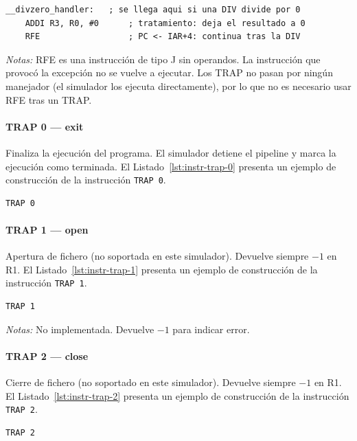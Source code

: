 \documentclass[../main.tex]{subfiles}
\begin{document}
\begin{lstlisting}[caption={RFE},label={lst:instr-rfe}]
	__divzero_handler:   ; se llega aqui si una DIV divide por 0
	ADDI R3, R0, #0      ; tratamiento: deja el resultado a 0
	RFE                  ; PC <- IAR+4: continua tras la DIV
\end{lstlisting}
\textit{Notas:} RFE es una instrucción de tipo J sin operandos. La instrucción que provocó la excepción no se vuelve a ejecutar. Los TRAP no pasan por ningún manejador (el simulador los ejecuta directamente), por lo que no es necesario usar RFE tras un TRAP.

\paragraph*{TRAP 0 --- exit}
Finaliza la ejecución del programa. El simulador detiene el pipeline y marca la ejecución como terminada.
El Listado~\ref{lst:instr-trap-0} presenta un ejemplo de construcción de la instrucción \texttt{TRAP 0}.

\begin{lstlisting}[caption={TRAP 0},label={lst:instr-trap-0}]
	TRAP 0
\end{lstlisting}

\paragraph*{TRAP 1 --- open}
Apertura de fichero (no soportada en este simulador). Devuelve siempre $-1$ en R1.
El Listado~\ref{lst:instr-trap-1} presenta un ejemplo de construcción de la instrucción \texttt{TRAP 1}.

\begin{lstlisting}[caption={TRAP 1},label={lst:instr-trap-1}]
	TRAP 1
\end{lstlisting}
\textit{Notas:} No implementada. Devuelve $-1$ para indicar error.

\paragraph*{TRAP 2 --- close}
Cierre de fichero (no soportado en este simulador). Devuelve siempre $-1$ en R1.
El Listado~\ref{lst:instr-trap-2} presenta un ejemplo de construcción de la instrucción \texttt{TRAP 2}.

\begin{lstlisting}[caption={TRAP 2},label={lst:instr-trap-2}]
	TRAP 2
\end{lstlisting}
\end{document}
